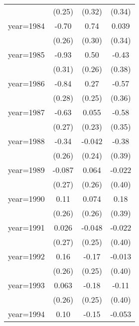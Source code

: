 \begin{sidewaystable}[htbp]
\begin{tabular}{l*{3}{c}}
                &   (0.25)         &   (0.32)         &   (0.34)         \\
\addlinespace
year=1984       &    -0.70\sym{***}&     0.74\sym{**} &    0.039         \\
                &   (0.26)         &   (0.30)         &   (0.34)         \\
\addlinespace
year=1985       &    -0.93\sym{***}&     0.50\sym{*}  &    -0.43         \\
                &   (0.31)         &   (0.26)         &   (0.38)         \\
\addlinespace
year=1986       &    -0.84\sym{***}&     0.27         &    -0.57         \\
                &   (0.28)         &   (0.25)         &   (0.36)         \\
\addlinespace
year=1987       &    -0.63\sym{**} &    0.055         &    -0.58         \\
                &   (0.27)         &   (0.23)         &   (0.35)         \\
\addlinespace
year=1988       &    -0.34         &   -0.042         &    -0.38         \\
                &   (0.26)         &   (0.24)         &   (0.39)         \\
\addlinespace
year=1989       &   -0.087         &    0.064         &   -0.022         \\
                &   (0.27)         &   (0.26)         &   (0.40)         \\
\addlinespace
year=1990       &     0.11         &    0.074         &     0.18         \\
                &   (0.26)         &   (0.26)         &   (0.39)         \\
\addlinespace
year=1991       &    0.026         &   -0.048         &   -0.022         \\
                &   (0.27)         &   (0.25)         &   (0.40)         \\
\addlinespace
year=1992       &     0.16         &    -0.17         &   -0.013         \\
                &   (0.26)         &   (0.25)         &   (0.40)         \\
\addlinespace
year=1993       &    0.063         &    -0.18         &    -0.11         \\
                &   (0.26)         &   (0.25)         &   (0.40)         \\
\addlinespace
year=1994       &     0.10         &    -0.15         &   -0.053         \\

\end{tabular}
\end{sidewaystable}
